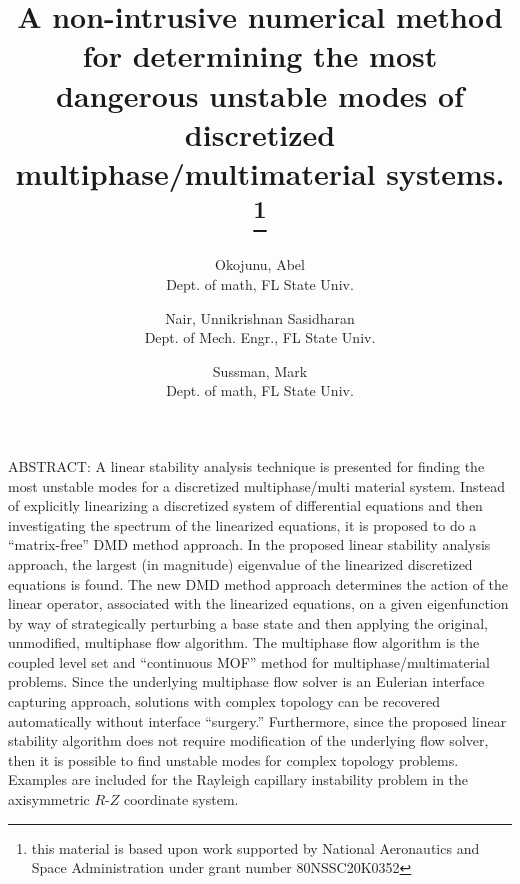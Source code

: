 \documentclass[]{article}
\title{A non-intrusive numerical method for determining the most
  dangerous unstable modes of discretized
  multiphase/multimaterial systems.
  \thanks{this material is based upon work supported by National
   Aeronautics and Space Administration under grant number
   80NSSC20K0352}}
\author{
  Okojunu, Abel \\
  Dept. of math, FL State Univ. 
  \and
  Nair, Unnikrishnan Sasidharan \\
  Dept. of Mech. Engr., FL State Univ.
  \and
  Sussman, Mark \\
  Dept. of math, FL State Univ. 
}
\begin{document}
\maketitle
ABSTRACT:
A linear stability analysis technique is presented for finding the most
unstable modes for a discretized multiphase/multi material system.  
Instead of explicitly linearizing a discretized system of differential
equations and then
investigating the spectrum of the linearized equations, it is proposed
to do a ``matrix-free'' DMD method approach.  In the proposed
linear stability analysis approach, the largest (in magnitude)
eigenvalue of the linearized discretized equations is found.
The new 
DMD method approach determines the action of the linear operator, 
associated with the linearized equations, on a given eigenfunction by 
way of strategically perturbing a base state and then applying the
original, unmodified, multiphase flow algorithm.  
The multiphase flow algorithm is the coupled level set and 
``continuous MOF'' method for multiphase/multimaterial problems.  Since the
underlying multiphase flow solver is an Eulerian interface capturing approach, 
solutions with complex topology can be recovered automatically without 
interface ``surgery.'' Furthermore, since the proposed linear
stability algorithm does not require modification of the
underlying flow solver, then it is possible to find unstable modes for
complex topology problems.  Examples are included for the Rayleigh capillary
instability problem in the axisymmetric $R$-$Z$ coordinate system.



\linenumbers
\end{document}
